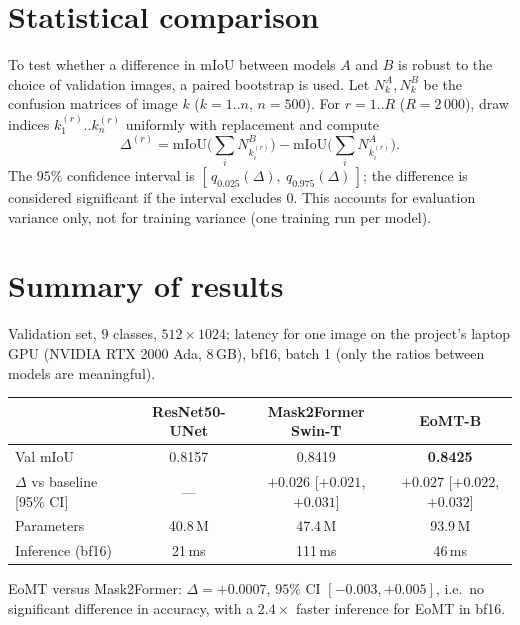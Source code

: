 \documentclass[11pt,a4paper]{article}
\newcommand{\1}{\mathbb{1}}
\begin{document}
\section{Statistical comparison}\label{sec:stats}

To test whether a difference in mIoU between models $A$ and $B$ is robust to
the choice of validation images, a paired bootstrap \cite{efron1993} is used.
Let $N^{A}_k, N^{B}_k$ be the confusion matrices of image $k$
($k=1..n$, $n=500$). For $r=1..R$ ($R=2\,000$), draw indices
$k^{(r)}_1..k^{(r)}_n$ uniformly with replacement and compute
\[
\Delta^{(r)} = \mathrm{mIoU}\Big(\sum_{i} N^{B}_{k^{(r)}_i}\Big) - \mathrm{mIoU}\Big(\sum_{i} N^{A}_{k^{(r)}_i}\Big).
\]
The $95\%$ confidence interval is
$[\,q_{0.025}(\Delta),\ q_{0.975}(\Delta)\,]$; the difference is considered
significant if the interval excludes $0$. This accounts for evaluation
variance only, not for training variance (one training run per model).

\section{Summary of results}

Validation set, $9$ classes, $512\times1024$; latency for one image on the
project's laptop GPU (NVIDIA RTX 2000 Ada, 8\,GB), bf16, batch 1 (only the
ratios between models are meaningful).

\begin{center}
\small
\begin{tabular}{lccc}
\toprule
 & ResNet50-UNet & Mask2Former Swin-T & EoMT-B \\
\midrule
Val mIoU & 0.8157 & 0.8419 & \textbf{0.8425} \\
$\Delta$ vs baseline [95\% CI] & --- & $+0.026$ [$+0.021$, $+0.031$] & $+0.027$ [$+0.022$, $+0.032$] \\
Parameters & 40.8\,M & 47.4\,M & 93.9\,M \\
Inference (bf16) & 21\,ms & 111\,ms & 46\,ms \\
\bottomrule
\end{tabular}
\end{center}

EoMT versus Mask2Former: $\Delta = +0.0007$, $95\%$ CI
$[-0.003, +0.005]$, i.e.\ no significant difference in accuracy, with a
$2.4\times$ faster inference for EoMT in bf16.
\end{document}
